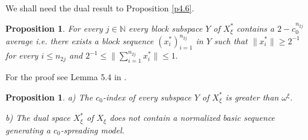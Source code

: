 \documentclass[a4paper]{amsart}
\theoremstyle{plain}
\newtheorem{proposition}[theorem]{Proposition}
\newcommand{\N}{\mathbb{N}}
\newcommand{\norm}[1][\cdot]{\lVert #1\rVert}
\begin{document}
We shall need  the dual result to Proposition \ref{p4.6}.
\begin{proposition}\label{p4.7}
For every $j\in\N$ every block subspace $Y$ of $X_{\xi}^{*}$ contains a
$2-c_{0}^{n_{2j}}$ average i.e. there exists a block sequence
$(x_{i}^{*})_{i=1}^{n_{2j}}$ in $Y$ such that $\norm[x_{i}^{*}]\geq 2^{-1}$ for every
$i\leq n_{2j}$ and
$
2^{-1}\leq \|\sum_{i=1}^{n_{2j}}x_{i}^{*}\|\leq 1.
$
\end{proposition}
For the proof see   Lemma 5.4 in \cite{AT}.
\begin{proposition}\label{p413}
 a) The  $c_0$-index of every subspace $Y$ of $X_\xi^{*}$ is greater than $\omega^{\xi}$.

b) The dual space $X_\xi^{*}$ of $X_\xi$ does not contain a normalized basic sequence
generating a $c_0$-spreading model.
\end{proposition}
\end{document}
